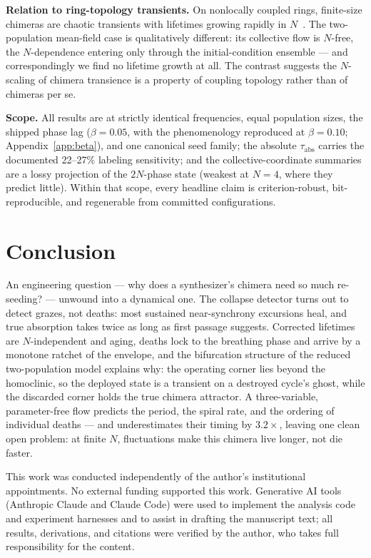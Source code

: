 \documentclass[aip,preprint,amsmath,amssymb]{revtex4-2}
\begin{document}
\textbf{Relation to ring-topology transients.} On nonlocally coupled rings,
finite-size chimeras are chaotic transients with lifetimes growing rapidly in
$N$~\cite{wo2011}. The two-population mean-field case is qualitatively different:
its collective flow is $N$-free, the $N$-dependence entering only through the
initial-condition ensemble --- and correspondingly we find no lifetime growth at
all. The contrast suggests the $N$-scaling of chimera transience is a property of
coupling topology rather than of chimeras per se.

\textbf{Scope.} All results are at strictly identical frequencies, equal population
sizes, the shipped phase lag ($\beta = 0.05$, with the phenomenology reproduced at
$\beta = 0.10$; Appendix~\ref{app:beta}), and one canonical seed family; the absolute
$\tau_{\mathrm{abs}}$ carries the documented 22--27\% labeling sensitivity; and the
collective-coordinate summaries are a lossy projection of the $2N$-phase state
(weakest at $N = 4$, where they predict little). Within that scope, every headline
claim is criterion-robust, bit-reproducible, and regenerable from committed
configurations.

\section{Conclusion}\label{sec:conclusion}

An engineering question --- why does a synthesizer's chimera need so much
re-seeding? --- unwound into a dynamical one. The collapse detector turns out to
detect grazes, not deaths: most sustained near-synchrony excursions heal, and true
absorption takes twice as long as first passage suggests. Corrected lifetimes are
$N$-independent and aging, deaths lock to the breathing phase and arrive by a
monotone ratchet of the envelope, and the bifurcation structure of the reduced
two-population model explains why: the operating corner lies beyond the homoclinic,
so the deployed state is a transient on a destroyed cycle's ghost, while the
discarded corner holds the true chimera attractor. A three-variable, parameter-free
flow predicts the period, the spiral rate, and the ordering of individual deaths
--- and underestimates their timing by $3.2\times$, leaving one clean open problem:
at finite $N$, fluctuations make this chimera live longer, not die faster.

\begin{acknowledgments}
This work was conducted independently of the author's institutional appointments.
No external funding supported this work. Generative AI tools (Anthropic Claude and
Claude Code) were used to implement the analysis code and experiment harnesses and
to assist in drafting the manuscript text; all results, derivations, and citations
were verified by the author, who takes full responsibility for the content.
\end{acknowledgments}
\end{document}
